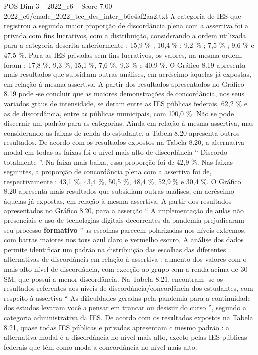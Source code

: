 \begin{textsample}{POS Dim 3 – 2022\_c6 – Score 7.00 – 2022\_c6/enade\_2022\_tec\_des\_inter\_b6c4af2aa2.txt}
A categoria de IES que registrou a segunda maior proporção de discordância plena com a assertiva foi a privada com fins lucrativos, com a distribuição, considerando a ordem utilizada para a categoria descrita anteriormente : 15,9 \% ; 10,4 \% ; 9,2 \% ; 7,5 \% ; 9,6 \% e 47,5 \%.
Para as IES privadas sem fins lucrativos, os valores, na mesma ordem, foram : 17,8 \%, 9,3 \%, 15,1 \%, 7,6 \%, 9,3 \% e 40,9 \%.
O Gráfico 8.19 apresenta mais resultados que subsidiam outras análises, em acréscimo àquelas já expostas, em relação à mesma assertiva.
A partir dos resultados apresentados no Gráfico 8.19 pode -se concluir que as maiores demonstrações de concordância, nos seus variados graus de intensidade, se deram entre as IES públicas federais, 62,2 \% e as de discordância, entre as públicas municipais, com 100,0 \%.
Não se pode discernir um padrão para as categorias.
Ainda em relação à mesma assertiva, mas considerando as faixas de renda do estudante, a Tabela 8.20 apresenta outros resultados.
De acordo com os resultados expostos na Tabela 8.20, a alternativa modal em todas as faixas foi o nível mais alto de discordância “ Discordo totalmente ”.
Na faixa mais baixa, essa proporção foi de 42,9 \%.
Nas faixas seguintes, a proporção de concordância plena com a assertiva foi de, respectivamente : 43,1 \%, 43,4 \%, 50,5 \%, 48,4 \%, 52,9 \% e 30,4 \%.
O Gráfico 8.20 apresenta mais resultados que subsidiam outras análises, em acréscimo àquelas já expostas, em relação à mesma assertiva.
A partir dos resultados apresentados no Gráfico 8.20, para a asserção “ A implementação de aulas não presenciais e uso de tecnologias digitais decorrentes da pandemia prejudicaram seu processo \textbf{formativo} ” as escolhas parecem polarizadas nos níveis extremos, com barras maiores nos tons azul claro e vermelho escuro.
A análise dos dados permite identificar um padrão na distribuição das escolhas das diferentes alternativas de discordância em relação à assertiva : aumento dos valores com o mais alto nível de discordância, com exceção ao grupo com a renda acima de 30 SM, que possui a menor discordância.
Na Tabela 8.21, encontram -se os resultados referentes aos níveis de discordância/concordância dos estudantes, com respeito à assertiva “ As dificuldades geradas pela pandemia para a continuidade dos estudos levaram você a pensar em trancar ou desistir do curso ”, segundo a categoria administrativa da IES.
De acordo com os resultados expostos na Tabela 8.21, quase todas IES públicas e privadas apresentam o mesmo padrão : a alternativa modal é a discordância no nível mais alto, exceto pelas IES públicas federais que têm como moda a concordância no nível mais alto.

\end{textsample}
